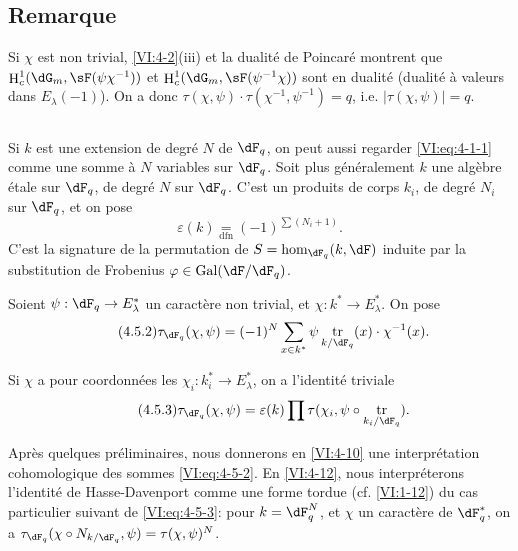 \documentclass[oneside]{book}
\DeclareMathOperator{\gal}{Gal}
\DeclareMathOperator{\h}{H}
\DeclareMathOperator{\tr}{tr}
\theoremstyle{sga-source}
\theoremstyle{sga-source-dash}
\theoremstyle{sga-source-dotdash}
\theoremstyle{sga-source-number-note-dash}
\theoremstyle{sga-source-note-number-dotdash}
\theoremstyle{sga-source-example-dotdash}
\theoremstyle{sga-source-inline-number}
\theoremstyle{sga-source-bare-number}
\theoremstyle{sga-source}
\newcommand{\PrintPage}[1]{}\newcommand{\MathPage}[1]{}\newcommand{\PrintCite}[2]{#1}\newcommand{\var}[3]{#1}
\begin{document}
\subsection{Remarque}\label{VI:4-4}

Si $\chi$ est non trivial, \ref{VI:4-2}(iii) et la dualité de Poincaré 
montrent que $\h_c^1(\dG_m,\sF(\psi\chi^{-1}))$ et 
$\h_c^1(\dG_m,\sF(\psi^{-1}\chi))$ sont en dualité (dualité à valeurs 
dans $E_\lambda(-1)$). On a donc 
$\tau(\chi,\psi)\cdot \tau(\chi^{-1},\psi^{-1}) = q$, i.e. 
$\var{|\tau(\chi,\psi)|=q}{|\tau(\chi,\psi)|=q^{1/2}}{S45-SOL-0805}$. 





\subsection{}\label{VI:4-5}

Si $k$ est une extension de degré $N$ de $\dF_q$, on peut aussi regarder 
\eqref{VI:eq:4-1-1} comme une somme à $N$ variables sur $\dF_q$. Soit plus 
généralement $k$ une algèbre étale sur $\dF_q$, de degré $N$ sur 
$\dF_q$. C'est \var{un produits de corps}{un produit de corps}{S45-SOL-0806} $k_i$, de degré $N_i$ sur $\dF_q$, et on pose 
\begin{equation*}\tag{4.5.1}\label{VI:eq:4-5-1}
  \varepsilon(k) \underset{\mathrm{dfn}}{=} (-1)^{\sum (N_i+1)} \text{.} 
\end{equation*}
C'est la signature de la permutation de $S=\hom_{\dF_q}(k,\dF)$ induite par la 
substitution de Frobenius $\varphi\in \gal(\dF/\dF_q)$. 

Soient $\psi:\dF_q\to E_\lambda^\ast$ un caractère non trivial, et 
$\chi:k^\ast \to E_\lambda^\ast$. On pose 
\begin{equation*}\tag{4.5.2}\label{VI:eq:4-5-2}
  \tau_{\dF_q}(\chi,\psi) = (-1)^N \sum_{x\in k^\ast} \psi \tr_{k/\dF_q}(x) \cdot \chi^{-1}(x) \text{.} 
\end{equation*}

Si $\chi$ a pour coordonnées les $\chi_i:k_i^\ast \to E_\lambda^\ast$, on 
a l'identité triviale 
\begin{equation*}\tag{4.5.3}\label{VI:eq:4-5-3}
  \tau_{\dF_q}(\chi,\psi) = \varepsilon(k) \prod \tau(\chi_i,\psi\circ \tr_{k_i/\dF_q}) \text{.}
\end{equation*}

\PrintPage{198}
Après quelques préliminaires, nous donnerons en \ref{VI:4-10} une 
interprétation cohomologique des sommes \eqref{VI:eq:4-5-2}. En 
\ref{VI:4-12}, nous interpréterons l'identité de Hasse-Davenport comme une 
forme tordue (cf. \ref{VI:1-12}) du cas particulier suivant de 
\eqref{VI:eq:4-5-3}: pour $k=\dF_q^N$, et $\chi$ un caractère de 
$\dF_q^\ast$, on a 
$\tau_{\dF_q}(\chi\circ N_{k/\dF_q},\psi)=\tau(\chi,\psi)^N$. 
\end{document}
